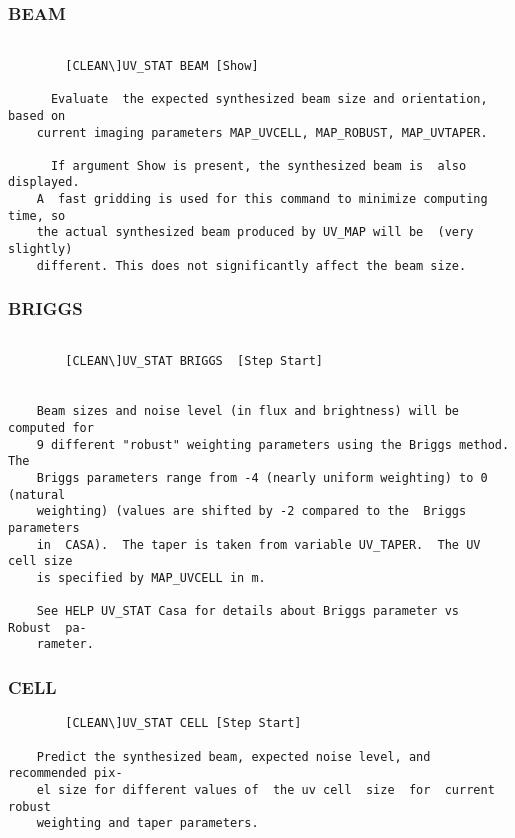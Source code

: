 \subsubsection{BEAM}
\begin{verbatim}

        [CLEAN\]UV_STAT BEAM [Show]

      Evaluate  the expected synthesized beam size and orientation, based on
    current imaging parameters MAP_UVCELL, MAP_ROBUST, MAP_UVTAPER.

      If argument Show is present, the synthesized beam is  also  displayed.
    A  fast gridding is used for this command to minimize computing time, so
    the actual synthesized beam produced by UV_MAP will be  (very  slightly)
    different. This does not significantly affect the beam size.

\end{verbatim}
\subsubsection{BRIGGS}
\begin{verbatim}

        [CLEAN\]UV_STAT BRIGGS  [Step Start]


    Beam sizes and noise level (in flux and brightness) will be computed for
    9 different "robust" weighting parameters using the Briggs method.   The
    Briggs parameters range from -4 (nearly uniform weighting) to 0 (natural
    weighting) (values are shifted by -2 compared to the  Briggs  parameters
    in  CASA).  The taper is taken from variable UV_TAPER.  The UV cell size
    is specified by MAP_UVCELL in m.

    See HELP UV_STAT Casa for details about Briggs parameter vs  Robust  pa-
    rameter.

\end{verbatim}
\subsubsection{CELL}
\begin{verbatim}
        [CLEAN\]UV_STAT CELL [Step Start]

    Predict the synthesized beam, expected noise level, and recommended pix-
    el size for different values of  the uv cell  size  for  current  robust
    weighting and taper parameters.

\end{verbatim}

